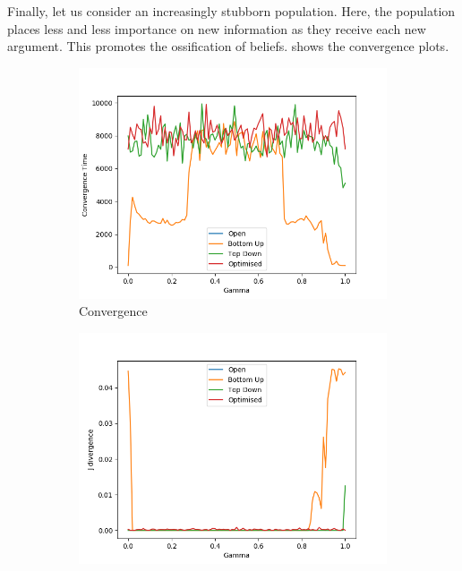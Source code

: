 Finally, let us consider an increasingly stubborn population. Here, the population places less and less importance on new information as they receive each new argument. This promotes the ossification of beliefs.  shows the convergence plots. 


\begin{figure}[H]
 \centering
  \begin{subfigure}[ht]{0.45\textwidth}
    \includegraphics[width=\textwidth]{Images/Figures/ListenerModelPlots/Ageing/Convergence.png}
    \caption{Convergence}
 \end{subfigure}
 \hfill
 \begin{subfigure}[ht]{0.45\textwidth}
    \includegraphics[width=\textwidth]{Images/Figures/ListenerModelPlots/Ageing/J-Div.png}

\end{subfigure}
\end{figure}
